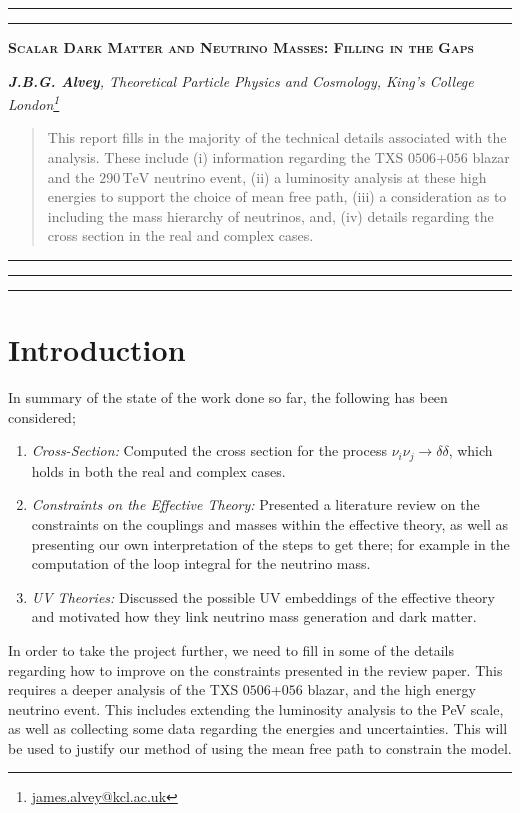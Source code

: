 \documentclass[10pt]{article}
\renewcommand*{\thefootnote}{\fnsymbol{footnote}}
\begin{document}
\hrule
\vspace{1pt}
\hrule
\begin{center}
\large\textsc{\color{darkblue}\textbf{Scalar Dark Matter and Neutrino Masses: Filling in the Gaps}}
\vspace{5pt}

\footnotesize\textit{\textbf{J.B.G. Alvey}, Theoretical Particle Physics and Cosmology, King's College London\footnote{\href{mailto:james.alvey@kcl.ac.uk}{james.alvey@kcl.ac.uk}}}
\end{center}
\begin{abstract}
\noindent This report fills in the majority of the technical details associated with the analysis. These include (i) information regarding the TXS $0506$+$056$ blazar and the $290\,\text{TeV}$ neutrino event, (ii) a luminosity analysis at these high energies to support the choice of mean free path, (iii) a consideration as to including the mass hierarchy of neutrinos, and, (iv) details regarding the cross section in the real and complex cases.
\end{abstract}
\hrule
\tableofcontents
\vspace{5pt}
\hrule
\vspace{1pt}
\hrule
\vspace{10pt}
\renewcommand{\thefootnote}{\tiny\textbf{\arabic{section}.\arabic{footnote}}}
\section{Introduction}
In summary of the state of the work done so far, the following has been considered;
\begin{enumerate}
  \item \textit{Cross-Section:} Computed the cross section for the process $\nu_i\nu_j \rightarrow \delta \delta$, which holds in both the real and complex cases.
  \item \textit{Constraints on the Effective Theory:} Presented a literature review on the constraints on the couplings and masses within the effective theory, as well as presenting our own interpretation of the steps to get there; for example in the computation of the loop integral for the neutrino mass.
  \item \textit{UV Theories:} Discussed the possible UV embeddings of the effective theory and motivated how they link neutrino mass generation and dark matter.
\end{enumerate}
In order to take the project further, we need to fill in some of the details regarding how to improve on the constraints presented in the review paper. This requires a deeper analysis of the TXS $0506$+$056$ blazar, and the high energy neutrino event. This includes extending the luminosity analysis to the PeV scale, as well as collecting some data regarding the energies and uncertainties. This will be used to justify our method of using the mean free path to constrain the model.
\end{document}
